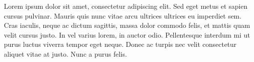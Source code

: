 Lorem ipsum dolor sit amet, consectetur adipiscing elit. Sed eget metus et sapien cursus pulvinar. Mauris quis nunc vitae arcu ultrices ultrices eu imperdiet sem. Cras iaculis, neque ac dictum sagittis, massa dolor commodo felis, et mattis quam velit cursus justo. In vel varius lorem, in auctor odio. Pellentesque interdum mi ut purus luctus viverra tempor eget neque. Donec ac turpis nec velit consectetur aliquet vitae at justo. Nunc a purus felis.
